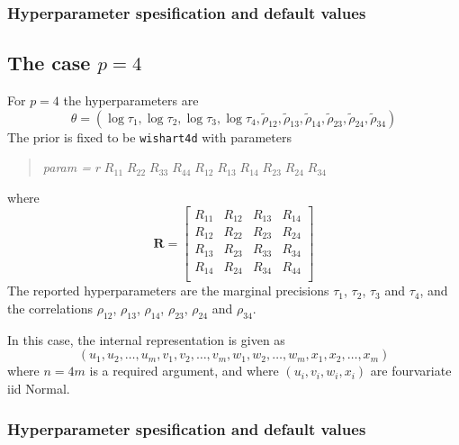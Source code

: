 \documentclass[a4paper,11pt]{article}
\begin{document}
\subsubsection*{Hyperparameter spesification and default values}


\subsection*{The case $p=4$}

For $p=4$ the
hyperparameters are
\begin{displaymath}
    \theta = (\log \tau_{1}, \log \tau_{2}, \log \tau_{3}, \log \tau_{4},
    \tilde\rho_{12},
    \tilde\rho_{13},
    \tilde\rho_{14},
    \tilde\rho_{23},
    \tilde\rho_{24},
    \tilde\rho_{34})
\end{displaymath}
The prior is fixed to be \texttt{wishart4d} with parameters
\begin{quote}
    \emph{param = } $r\;R_{11}\;R_{22}\;R_{33}\; R_{44}\;
    R_{12}\;
    R_{13}\;
    R_{14}\;
    R_{23}\;
    R_{24}\;
    R_{34}$
\end{quote}
where
\begin{displaymath}
    \mathbf{R} =
    \left[\begin{array}{cccc}
        R_{11} &R_{12} & R_{13} & R_{14}\\
        R_{12} & R_{22} & R_{23} & R_{24}\\
        R_{13} & R_{23} & R_{33} & R_{34}\\
        R_{14} & R_{24} & R_{34} & R_{44}\\
    \end{array}\right]
\end{displaymath}
The reported hyperparameters are the marginal precisions $\tau_{1}$,
$\tau_{2}$, $\tau_{3}$ and $\tau_{4}$, and the correlations
$\rho_{12}$, $\rho_{13}$, $\rho_{14}$, $\rho_{23}$, $\rho_{24}$ and
$\rho_{34}$.

In this case, the internal representation is given as
\begin{displaymath}
    (u_{1}, u_{2}, \ldots, u_{m}, v_{1}, v_{2}, \ldots, v_{m},
    w_{1}, w_{2}, \ldots, w_{m},
    x_{1}, x_{2}, \ldots, x_{m})
\end{displaymath}
where $n=4m$ is a required argument, and where $(u_{i}, v_{i}, w_{i}, x_{i})$
are fourvariate iid Normal.

\subsubsection*{Hyperparameter spesification and default values}

\end{document}
